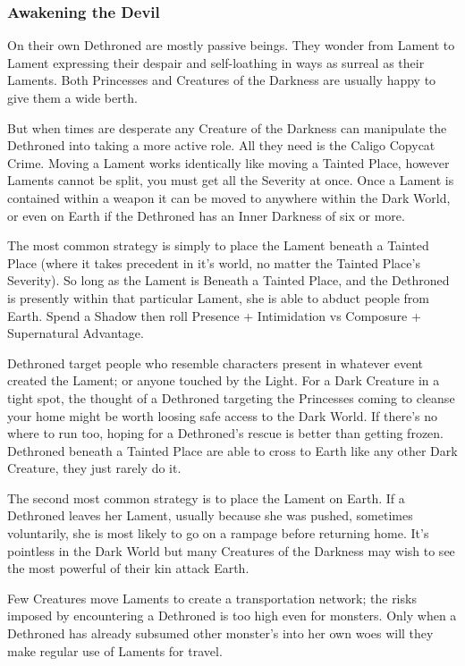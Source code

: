 \subsubsection*{Awakening the Devil}

On their own Dethroned are mostly passive beings. They wonder from Lament to Lament expressing their despair and self-loathing in ways as surreal as their Laments. Both Princesses and Creatures of the Darkness are usually happy to give them a wide berth.

But when times are desperate any Creature of the Darkness can manipulate the Dethroned into taking a more active role. All they need is the Caligo Copycat Crime. Moving a Lament works identically like moving a Tainted Place, however Laments cannot be split, you must get all the Severity at once. Once a Lament is contained within a weapon it can be moved to anywhere within the Dark World, or even on Earth if the Dethroned has an Inner Darkness of six or more.

The most common strategy is simply to place the Lament beneath a Tainted Place (where it takes precedent in it's world, no matter the Tainted Place's Severity). So long as the Lament is Beneath a Tainted Place, and the Dethroned is presently within that particular Lament, she is able to abduct people from Earth. Spend a Shadow then roll Presence + Intimidation vs Composure + Supernatural Advantage.

Dethroned target people who resemble characters present in whatever event created the Lament; or anyone touched by the Light. For a Dark Creature in a tight spot, the thought of a Dethroned targeting the Princesses coming to cleanse your home might be worth loosing safe access to the Dark World. If there's no where to run too, hoping for a Dethroned's rescue is better than getting frozen. Dethroned beneath a Tainted Place are able to cross to Earth like any other Dark Creature, they just rarely do it. 

The second most common strategy is to place the Lament on Earth. If a Dethroned leaves her Lament, usually because she was pushed, sometimes voluntarily, she is most likely to go on a rampage before returning home. It's pointless in the Dark World but many Creatures of the Darkness may wish to see the most powerful of their kin attack Earth.

Few Creatures move Laments to create a transportation network; the risks imposed by encountering a Dethroned is too high even for monsters. Only when a Dethroned has already subsumed other monster's into her own woes will they make regular use of Laments for travel.

